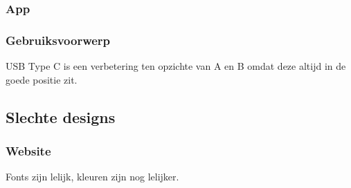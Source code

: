 \documentclass[11pt,english]{article}
\begin{document}
  \subsubsection{App}

  \subsubsection{Gebruiksvoorwerp}
  \begin{center}
  \end{center}
  USB Type C is een verbetering ten opzichte van A en B omdat deze altijd in de
  goede positie zit.

  \subsection{Slechte designs}
  \subsubsection{Website}
  \begin{center}
  \end{center}
  Fonts zijn lelijk, kleuren zijn nog lelijker.
\end{document}
